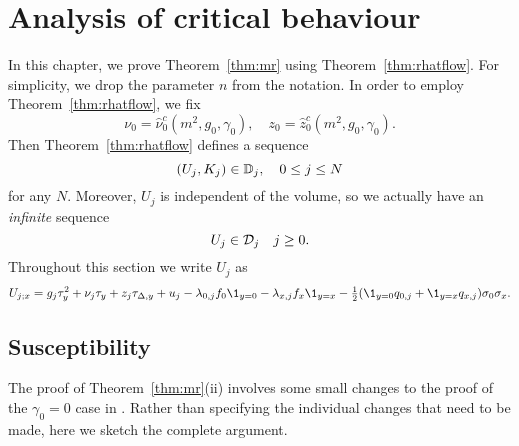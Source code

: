 \chapter{Analysis of critical behaviour}
\label{sec:chi-G-xi}

\setcounter{footnote}{0}


In this chapter, we prove Theorem~\ref{thm:mr} using Theorem~\ref{thm:rhatflow}.
For simplicity, we drop the parameter $n$ from the notation. In order to employ
Theorem~\ref{thm:rhatflow}, we fix
\begin{equation}
\nu_0 = \hat\nu_0^c(m^2, g_0, \gamma_0),
	\quad
z_0 = \hat z_0^c(m^2, g_0, \gamma_0).
\end{equation}
Then Theorem~\ref{thm:rhatflow} defines a sequence
\begin{equation}
(U_j, K_j) \in \mathbb{D}_j,
	\quad
0 \le j \le N
\end{equation}
for any $N$. Moreover, $U_j$ is independent of the volume, so we actually have
an \emph{infinite} sequence
\begin{equation}
U_j \in \mathcal{D}_j
	\quad
j \ge 0.
\end{equation}
Throughout this section we write $U_j$ as
\begin{equation}
U_{j;x}
	=
g_j \tau_y^2 + \nu_j \tau_y + z_j \tau_{\Delta,y} + u_j
- \lambda_{0,j} f_0 \1_{y=0}
- \lambda_{x,j} f_x \1_{y=x}
- \tfrac12 (\1_{y=0} q_{0,j} + \1_{y=x} q_{x,j}) \sigma_0 \sigma_x.
\end{equation}



\section{Susceptibility}
\label{sec:suscept}

The proof of Theorem~\ref{thm:mr}(ii) involves some small changes to the proof
of the $\gamma_0 = 0$ case in \cite{BBS-saw4-log}. Rather than specifying the
individual changes that need to be made, here we sketch the complete argument.

